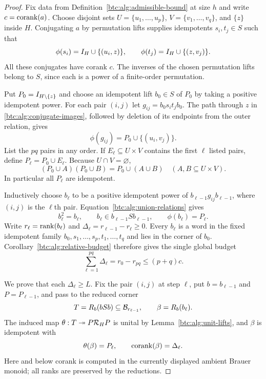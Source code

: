 \begin{proof}
Fix data from Definition~\ref{btc:alg:admissible-bound} at size $h$ and
write $c=\operatorname{corank}(a)$. Choose disjoint sets
$U=\{u_1,\ldots,u_p\}$, $V=\{v_1,\ldots,v_q\}$, and $\{z\}$
inside $H$. Conjugating $a$ by permutation lifts supplies idempotents
$s_i,t_j\in S$ such that
\begin{equation}\label{btc:alg:conjugate-images}
 \phi(s_i)=I_H\cup\{(u_i,z)\},\qquad
 \phi(t_j)=I_H\cup\{(z,v_j)\}.
\end{equation}
All these conjugates have corank $c$. The inverses of the chosen
permutation lifts belong to $S$, since each is a power of a
finite-order permutation.

Put $P_0=I_{H\setminus\{z\}}$ and choose an idempotent lift
$b_0\in S$ of $P_0$ by taking a positive idempotent power.
For each pair $(i,j)$ let $g_{ij}=b_0s_it_jb_0$. The path through
$z$ in \eqref{btc:alg:conjugate-images}, followed by deletion of its
endpoints from the outer relation, gives
\[
 \phi(g_{ij})=P_0\cup\{(u_i,v_j)\}.
\]
List the $pq$ pairs in any order. If $E_\ell\subseteq U\times V$
contains the first $\ell$ listed pairs, define $P_\ell=P_0\cup E_\ell$.
Because $U\cap V=\varnothing$,
\begin{equation}\label{btc:alg:union-relations}
 (P_0\cup A)(P_0\cup B)=P_0\cup(A\cup B)
 \quad(A,B\subseteq U\times V).
\end{equation}
In particular all $P_\ell$ are idempotent.

Inductively choose $b_\ell$ to be a positive idempotent power of
$b_{\ell-1}g_{ij}b_{\ell-1}$, where $(i,j)$ is the $\ell$th pair.
Equation~\eqref{btc:alg:union-relations} gives
\begin{equation}\label{btc:alg:chain}
 b_\ell^2=b_\ell,\qquad
 b_\ell\in b_{\ell-1}Sb_{\ell-1},\qquad
 \phi(b_\ell)=P_\ell.
\end{equation}
Write $r_\ell=\operatorname{rank}(b_\ell)$ and
$\Delta_\ell=r_{\ell-1}-r_\ell\ge0$. Every $b_\ell$ is a word in
the fixed idempotent family $b_0,s_1,\ldots,s_p,t_1,\ldots,t_q$
and lies in the corner of $b_0$. Corollary~\ref{btc:alg:relative-budget}
therefore gives the single global budget
\begin{equation}\label{btc:alg:global-budget}
 \sum_{\ell=1}^{pq}\Delta_\ell
 =r_0-r_{pq}\le(p+q)c.
\end{equation}

We prove that each $\Delta_\ell\ge L$. Fix the pair $(i,j)$ at
step $\ell$, put $b=b_{\ell-1}$ and $P=P_{\ell-1}$, and pass to
the reduced corner
\[
 T=R_b(bSb)\subseteq\mathcal{B}_{r_{\ell-1}},\qquad
 \beta=R_b(b_\ell).
\]
The induced map $\theta:T\twoheadrightarrow P\mathcal{R}_{H}P$ is unital
by Lemma~\ref{btc:alg:unit-lifts}, and $\beta$ is idempotent with
\[
 \theta(\beta)=P_\ell,\qquad \operatorname{corank}(\beta)=\Delta_\ell.
\]
Here and below corank is computed in the currently displayed ambient
Brauer monoid; all ranks are preserved by the reductions.


\end{proof}
